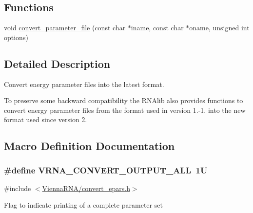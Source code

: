 \subsection*{Functions}
\begin{DoxyCompactItemize}
\item 
void \hyperlink{group__energy__parameters__convert_gafbe538bc4eb2cf2a33326e1010005f8a}{convert\+\_\+parameter\+\_\+file} (const char $\ast$iname, const char $\ast$oname, unsigned int options)
\end{DoxyCompactItemize}


\subsection{Detailed Description}
Convert energy parameter files into the latest format. 

To preserve some backward compatibility the R\+N\+Alib also provides functions to convert energy parameter files from the format used in version 1.-\/1. into the new format used since version 2. 

\subsection{Macro Definition Documentation}
\hypertarget{group__energy__parameters__convert_ga8dc6aee5a806c49b71557152f9616bc4}{}
\subsubsection[{V\+R\+N\+A\+\_\+\+C\+O\+N\+V\+E\+R\+T\+\_\+\+O\+U\+T\+P\+U\+T\+\_\+\+A\+L\+L}]{\setlength{\rightskip}{0pt plus 5cm}\#define V\+R\+N\+A\+\_\+\+C\+O\+N\+V\+E\+R\+T\+\_\+\+O\+U\+T\+P\+U\+T\+\_\+\+A\+L\+L~1\+U}\label{group__energy__parameters__convert_ga8dc6aee5a806c49b71557152f9616bc4}


{\ttfamily \#include $<$\hyperlink{convert__epars_8h}{Vienna\+R\+N\+A/convert\+\_\+epars.\+h}$>$}

Flag to indicate printing of a complete parameter set \hypertarget{group__energy__parameters__convert_gaf66fe2cb11dfcfd32d791049c254a8a4}{}
